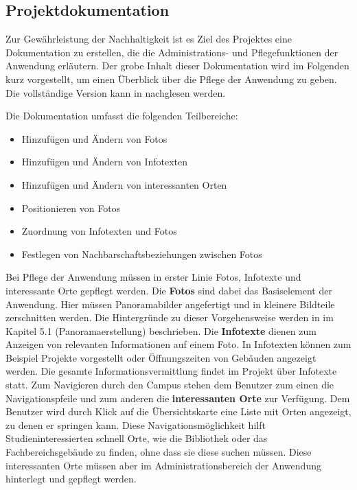 \subsection{Projektdokumentation}
\label{sec:Projektdokumentation}

Zur Gewährleistung der Nachhaltigkeit ist es Ziel des Projektes eine
Dokumentation zu erstellen, die die Administrations- und Pflegefunktionen der
Anwendung erläutern. Der grobe Inhalt dieser Dokumentation wird im Folgenden
kurz vorgestellt, um einen Überblick über die Pflege der Anwendung zu geben. Die
vollständige Version kann in \citet{projektdokumentation2014} nachglesen werden.

Die Dokumentation umfasst die folgenden Teilbereiche:

\begin{itemize}
  \item Hinzufügen und Ändern von Fotos
  \item Hinzufügen und Ändern von Infotexten
  \item Hinzufügen und Ändern von interessanten Orten
  \item Positionieren von Fotos
  \item Zuordnung von Infotexten und Fotos
  \item Festlegen von Nachbarschaftsbeziehungen zwischen Fotos
\end{itemize}

Bei Pflege der Anwendung müssen in erster Linie Fotos, Infotexte und interessante Orte gepflegt werden. Die \textbf{Fotos}
sind dabei das Basiselement der Anwendung. Hier müssen Panoramabilder angefertigt und in kleinere Bildteile zerschnitten
werden. Die Hintergründe zu dieser Vorgehensweise werden in \citet{modelierungUndBetrieb2014} im
Kapitel 5.1 (Panoramaerstellung) beschrieben.
Die \textbf{Infotexte} dienen zum Anzeigen von relevanten Informationen auf einem Foto. In Infotexten können
zum Beispiel Projekte vorgestellt oder Öffnungszeiten von Gebäuden angezeigt werden. Die gesamte Informationsvermittlung
findet im Projekt über Infotexte statt.
Zum Navigieren durch den Campus stehen dem Benutzer zum einen die Navigationspfeile und zum anderen die
\textbf{interessanten Orte} zur Verfügung. Dem Benutzer wird durch Klick auf die
Übersichtskarte eine Liste mit Orten angezeigt, zu denen er springen kann.
Diese Navigationsmöglichkeit hilft Studieninteressierten schnell Orte, wie die
Bibliothek oder das Fachbereichsgebäude zu finden, ohne dass sie diese suchen
müssen. Diese interessanten Orte müssen aber im Administrationsbereich der
Anwendung hinterlegt und gepflegt werden.

